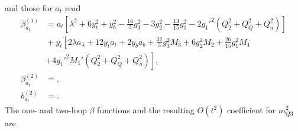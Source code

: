 \documentclass[preprint,amsmath,amssymb,aps,superscriptaddress,prd,showpacs,floatfix,nofootinbib]{revtex4-1}
\begin{document}
and those for $a_t$ read
\begin{subequations}
\begin{align}
\beta_{a_t}^{(1)}&=a_t\left [ \lambda^2+6y_t^2+y_b^2-\frac{16}{3}g_3^2-3g_2^2-\frac{13}{15}g_1^2-2g_1'^2\left ( Q_2^2+Q_Q^2+Q_u^2 \right )\right ]\nonumber\\
&{}+y_t\left [ 2\lambda a_\lambda + 12y_ta_t+2y_ba_b+\frac{32}{3}g_3^2M_3+6g_2^2M_2+\frac{26}{15}g_1^2M_1\right.\nonumber\\
&{}\left.+4g_1'^2M_1'\left ( Q_2^2+Q_Q^2+Q_u^2 \right )\right ],\label{eq:USSMTYu22BetaOneLoop}\\
\beta_{a_t}^{(2)}&=,\label{eq:USSMTYu22BetaTwoLoop}\\
b_{a_t}^{(2)}&=.\label{eq:USSMTYu22Ot2Coeff}
\end{align}
\end{subequations}
The one- and two-loop $\beta$ functions and the resulting $O(t^2)$ coefficient for $m_{Q3}^2$ are 
\end{document}

